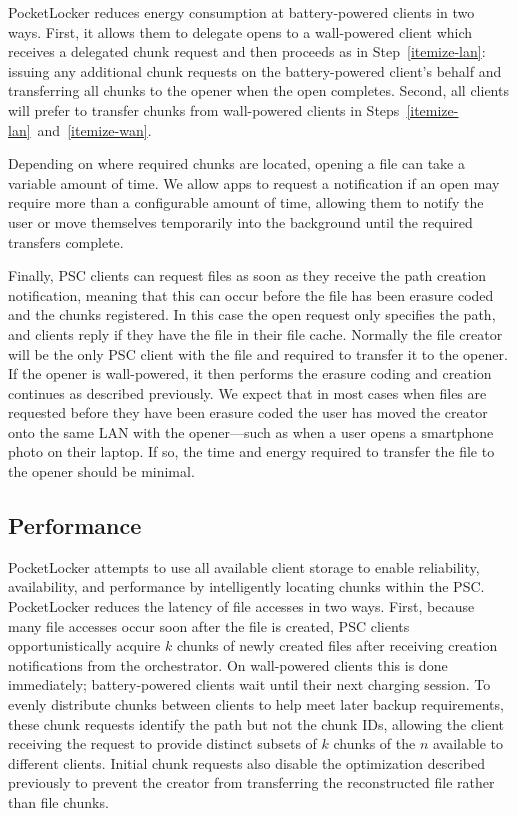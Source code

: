 PocketLocker reduces energy consumption at battery-powered clients in two
ways. First, it allows them to delegate opens to a wall-powered client which
receives a delegated chunk request and then proceeds as in
Step~\ref{itemize-lan}: issuing any additional chunk requests on the
battery-powered client's behalf and transferring all chunks to the opener when
the open completes. Second, all clients will prefer to transfer chunks from
wall-powered clients in Steps~\ref{itemize-lan}~and~\ref{itemize-wan}.

Depending on where required chunks are located, opening a file
can take a variable amount of time.  We allow apps
to request a notification if an open may require more than a configurable
amount of time, allowing them to notify the user or move themselves
temporarily into the background until the required transfers complete.

Finally, PSC clients can request files as soon as they receive the path
creation notification, meaning that this can occur before the file has been
erasure coded and the chunks registered. In this case the open request only
specifies the path, and clients reply if they have the file in their file
cache. Normally the file creator will be the only PSC client with the file
and required to transfer it to the opener. If the opener is wall-powered, it
then performs the erasure coding and creation continues as described
previously. We expect that in most cases when files are requested before they
have been erasure coded the user has moved the creator onto the same LAN with
the opener---such as when a user opens a smartphone photo on their laptop. If
so, the time and energy required to transfer the file to the opener should be
minimal.

\subsection{Performance}

PocketLocker attempts to use all available client storage to enable
reliability, availability, and performance by intelligently locating chunks
within the PSC. PocketLocker reduces the latency of file accesses in two
ways. First, because many file accesses occur soon after the file is created,
PSC clients opportunistically acquire $k$ chunks of newly created files after
receiving creation notifications from the orchestrator. On wall-powered
clients this is done immediately; battery-powered clients wait until their
next charging session. To evenly distribute chunks between clients to help
meet later backup requirements, these chunk requests identify the path but
not the chunk IDs, allowing the client receiving the request to provide
distinct subsets of $k$ chunks of the $n$ available to different clients.
Initial chunk requests also disable the optimization described previously to
prevent the creator from transferring the reconstructed file rather than file
chunks.

